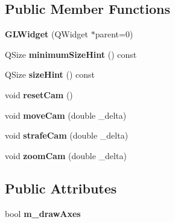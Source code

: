 \subsection*{Public Member Functions}
\begin{DoxyCompactItemize}
\item 
\hypertarget{class_g_l_widget_ab79c391c86de1ffb76f6950b49d82c0c}{{\bfseries G\-L\-Widget} (Q\-Widget $\ast$parent=0)}\label{class_g_l_widget_ab79c391c86de1ffb76f6950b49d82c0c}

\item 
\hypertarget{class_g_l_widget_ade3142625c1bfda0576e419b176cf8b1}{Q\-Size {\bfseries minimum\-Size\-Hint} () const }\label{class_g_l_widget_ade3142625c1bfda0576e419b176cf8b1}

\item 
\hypertarget{class_g_l_widget_a57698bc426052845b43a135a13540154}{Q\-Size {\bfseries size\-Hint} () const }\label{class_g_l_widget_a57698bc426052845b43a135a13540154}

\item 
\hypertarget{class_g_l_widget_aa46294065b5d7cce0595792401ad7b12}{void {\bfseries reset\-Cam} ()}\label{class_g_l_widget_aa46294065b5d7cce0595792401ad7b12}

\item 
\hypertarget{class_g_l_widget_af243f58b80dffdd66c3ad1fa26d0122a}{void {\bfseries move\-Cam} (double \-\_\-delta)}\label{class_g_l_widget_af243f58b80dffdd66c3ad1fa26d0122a}

\item 
\hypertarget{class_g_l_widget_a807139ab40c3c79de628af8d3cfb6e71}{void {\bfseries strafe\-Cam} (double \-\_\-delta)}\label{class_g_l_widget_a807139ab40c3c79de628af8d3cfb6e71}

\item 
\hypertarget{class_g_l_widget_ab0b5ab19881e8b9a1e1b748b08613dce}{void {\bfseries zoom\-Cam} (double \-\_\-delta)}\label{class_g_l_widget_ab0b5ab19881e8b9a1e1b748b08613dce}

\end{DoxyCompactItemize}
\subsection*{Public Attributes}
\begin{DoxyCompactItemize}
\item 
\hypertarget{class_g_l_widget_a20f2af9cd6308b71c95e8a96857dc46d}{bool {\bfseries m\-\_\-draw\-Axes}}\label{class_g_l_widget_a20f2af9cd6308b71c95e8a96857dc46d}

\end{DoxyCompactItemize}
